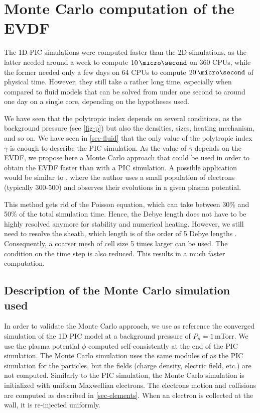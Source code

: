 
\section{Monte Carlo computation of the EVDF}
\label{sec-MCM}
  
  The \ac{1D} \ac{PIC} simulations were computed faster than the \ac{2D} simulations, as the latter needed around a week to compute $10\,\micro\second$ on 360 CPUs, while the former needed only a few days on 64 CPUs to compute $20\,\micro\second$ of physical time.
  However, they still take a rather long time, especially when compared to fluid models that can be solved from under one second to around one day on a single core, depending on the hypotheses used.
  
  We have seen that the polytropic index depends on several conditions, as the background pressure (see \cref{fig-p}) but also the densities, sizes, heating mechanism, and so on.
  We have seen in \cref{sec-fluid} that the only value of the polytropic index $\gamma$ is enough to describe the \ac{PIC} simulation.
  As the value of $\gamma$ depends on the \ac{EVDF}, we propose here a Monte Carlo approach that could be used in order to obtain the \ac{EVDF} faster than with a \ac{PIC} simulation.
  A possible application would be similar to \citet{kushner1983}, where the author uses a small population of electrons (typically 300-500) and observes their evolutions in a given plasma potential.
  
  This method gets rid of the Poisson equation, which can take between 30\% and 50\% of the total simulation time.
  Hence, the Debye length does not have to be highly resolved anymore for stability and numerical heating.
  However, we still need to resolve the sheath, which length is of the order of 5 Debye lengths \citep{chabert2014}.
  Consequently, a coarser mesh of cell size 5 times larger can be used.
  The condition on the time step is also reduced.
  This results in a much faster computation.

  \subsection{Description of the Monte Carlo simulation used}

    In order to validate the Monte Carlo approach, we use as reference the converged simulation of the \ac{1D} \ac{PIC} model at a background pressure of $P_n=1$\,mTorr.
    We use the plasma potential $\phi$ computed self-consistently at the end of the \ac{PIC} simulation.
    The Monte Carlo simulation uses the same modules of \LPPic as the \ac{PIC} simulation for the particles, but the fields (charge density, electric field, etc.) are not computed.
    Similarly to the \ac{PIC} simulation, the Monte Carlo simulation is initialized with uniform Maxwellian electrons.
    The electrons motion and collisions are computed as described in \cref{sec-elements}.
    When an electron is collected at the wall, it is re-injected uniformly.


